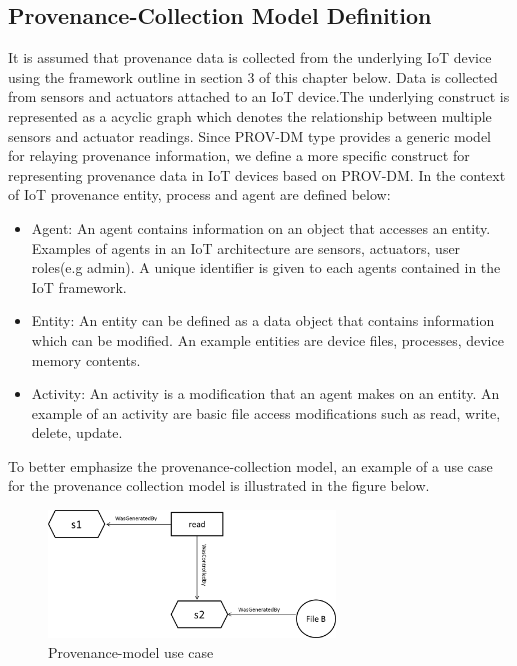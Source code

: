 \subsection{Provenance-Collection Model Definition}

It is assumed that provenance data is collected from the underlying IoT device using the framework outline in section 3 of this chapter below. Data is collected from sensors and actuators attached to an IoT device.The underlying construct is represented as a acyclic graph which denotes the relationship between multiple sensors and actuator readings. Since PROV-DM type provides a generic model for relaying provenance information, we define a more specific construct for representing provenance data in IoT devices based on  PROV-DM. In the context of IoT provenance entity, process and agent are defined below:

\begin{itemize}

\item Agent: An agent contains information on an object that accesses an entity. Examples of agents in an IoT architecture are sensors, actuators, user roles(e.g admin). A unique identifier is given to each agents contained in the IoT framework.

\item Entity:  An entity can be defined as a data object that contains information which can be modified. An example entities are device files, processes, device memory contents.

\item Activity: An activity is a modification that an agent makes on an entity. An example of an activity are basic file access modifications such as read, write, delete, update. 


\end{itemize}


To better emphasize the provenance-collection model, an example of a use case for the provenance collection model is illustrated in the figure below.



\begin{figure}[h]
\begin{center}

\includegraphics[width=3.0in]{usecase.png}    
\end{center}
\caption{Provenance-model use case}
\label{autom}
\end{figure}





